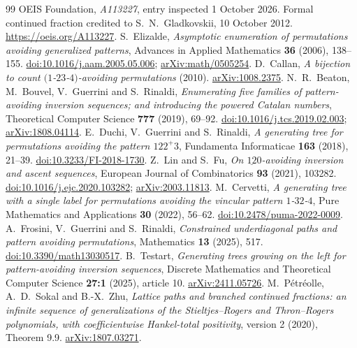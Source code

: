 \documentclass[11pt,letterpaper]{article}
\theoremstyle{remark}\newtheorem{remark}[theorem]{Remark}
\begin{document}
\begingroup\small
\begin{thebibliography}{99}
\setlength{\itemsep}{3pt}
 OEIS Foundation, \emph{A113227}, entry inspected 1 October 2026. Formal continued fraction credited to S.\ N.\ Gladkovskii, 10 October 2012. \url{https://oeis.org/A113227}.
 S.\ Elizalde, \emph{Asymptotic enumeration of permutations avoiding generalized patterns}, Advances in Applied Mathematics \textbf{36} (2006), 138--155. \href{https://doi.org/10.1016/j.aam.2005.05.006}{doi:10.1016/j.aam.2005.05.006}; \href{https://arxiv.org/abs/math/0505254}{arXiv:math/0505254}.
 D.\ Callan, \emph{A bijection to count $(1$-$23$-$4)$-avoiding permutations} (2010). \href{https://arxiv.org/abs/1008.2375}{arXiv:1008.2375}.
 N.\ R.\ Beaton, M.\ Bouvel, V.\ Guerrini and S.\ Rinaldi, \emph{Enumerating five families of pattern-avoiding inversion sequences; and introducing the powered Catalan numbers}, Theoretical Computer Science \textbf{777} (2019), 69--92. \href{https://doi.org/10.1016/j.tcs.2019.02.003}{doi:10.1016/j.tcs.2019.02.003}; \href{https://arxiv.org/abs/1808.04114}{arXiv:1808.04114}.
 E.\ Duchi, V.\ Guerrini and S.\ Rinaldi, \emph{A generating tree for permutations avoiding the pattern $122^+3$}, Fundamenta Informaticae \textbf{163} (2018), 21--39. \href{https://doi.org/10.3233/FI-2018-1730}{doi:10.3233/FI-2018-1730}.
 Z.\ Lin and S.\ Fu, \emph{On $\underline{12}0$-avoiding inversion and ascent sequences}, European Journal of Combinatorics \textbf{93} (2021), 103282. \href{https://doi.org/10.1016/j.ejc.2020.103282}{doi:10.1016/j.ejc.2020.103282}; \href{https://arxiv.org/abs/2003.11813}{arXiv:2003.11813}.
 M.\ Cervetti, \emph{A generating tree with a single label for permutations avoiding the vincular pattern $1$-$32$-$4$}, Pure Mathematics and Applications \textbf{30} (2022), 56--62. \href{https://doi.org/10.2478/puma-2022-0009}{doi:10.2478/puma-2022-0009}.
 A.\ Frosini, V.\ Guerrini and S.\ Rinaldi, \emph{Constrained underdiagonal paths and pattern avoiding permutations}, Mathematics \textbf{13} (2025), 517. \href{https://doi.org/10.3390/math13030517}{doi:10.3390/math13030517}.
 B.\ Testart, \emph{Generating trees growing on the left for pattern-avoiding inversion sequences}, Discrete Mathematics and Theoretical Computer Science \textbf{27:1} (2025), article 10. \href{https://arxiv.org/abs/2411.05726}{arXiv:2411.05726}.
 M.\ P\'etr\'eolle, A.\ D.\ Sokal and B.-X.\ Zhu, \emph{Lattice paths and branched continued fractions: an infinite sequence of generalizations of the Stieltjes--Rogers and Thron--Rogers polynomials, with coefficientwise Hankel-total positivity}, version 2 (2020), Theorem 9.9. \href{https://arxiv.org/abs/1807.03271}{arXiv:1807.03271}.

\end{thebibliography}
\end{document}
